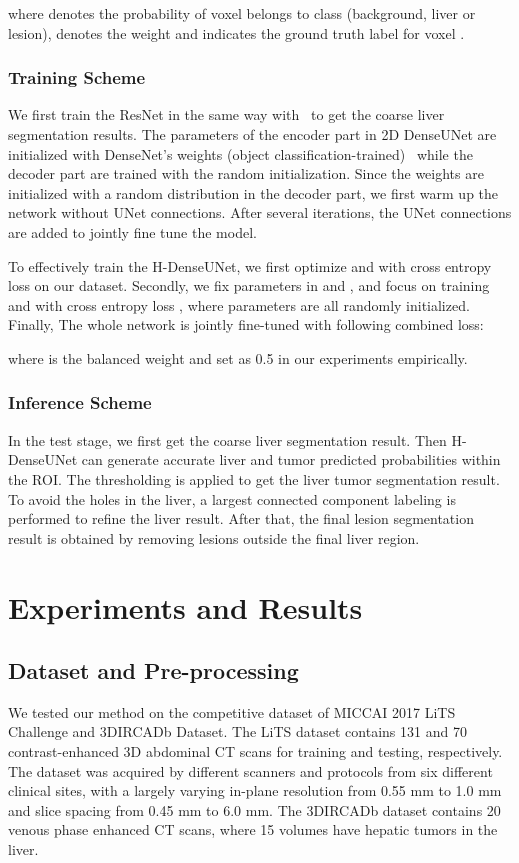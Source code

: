 \documentclass[journal]{IEEEtran}
\begin{document}
where  denotes the probability of voxel  belongs to class  (background, liver or lesion),  denotes the weight and  indicates the ground truth label for voxel . 

\subsubsection{Training Scheme}
We first train the ResNet in the same way with~\citet{han2017automatic} to get the coarse liver segmentation results.
The parameters of the encoder part in 2D DenseUNet  are initialized with DenseNet's weights (object classification-trained)~\cite{huang2017densely} while the decoder part are trained with the random initialization.
Since the weights are initialized with a random distribution in the decoder part, we first warm up the network without UNet connections.
After several iterations, the UNet connections are added to jointly fine tune the model.









To effectively train the H-DenseUNet, we first optimize  and  with cross entropy loss  on our dataset. Secondly, we fix parameters in  and , and focus on training  and  with cross entropy loss , where parameters are all randomly initialized. Finally, The whole network is jointly fine-tuned with following combined loss:

where  is the balanced weight and set as 0.5 in our experiments empirically. 


\subsubsection{Inference Scheme}
In the test stage, we first get the coarse liver segmentation result. Then H-DenseUNet can generate accurate liver and tumor predicted probabilities within the ROI.
The thresholding is applied to get the liver tumor segmentation result.
To avoid the holes in the liver, a largest connected component labeling is performed to refine the liver result.
After that, the final lesion segmentation result is obtained by removing lesions outside the final liver region.




\section{Experiments and Results}
\subsection{Dataset and Pre-processing}
We tested our method on the competitive dataset of MICCAI 2017 LiTS Challenge and 3DIRCADb Dataset. The LiTS dataset contains 131 and 70 contrast-enhanced 3D abdominal CT scans for training and testing, respectively.
The dataset was acquired by different scanners and protocols from six different clinical sites, with a largely varying in-plane resolution from 0.55 mm to 1.0 mm and slice spacing from 0.45 mm to 6.0 mm.
The 3DIRCADb dataset contains 20 venous phase enhanced CT scans, where 15 volumes have hepatic tumors in the liver.
\end{document}

